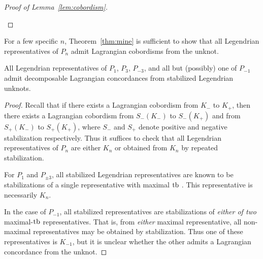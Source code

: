 \begin{proof}[Proof of Lemma~\ref{lem:cobordism}]
\begin{itemize}
\end{itemize}

\end{proof}

For a few specific $n$, Theorem~\ref{thm:mine} is sufficient to show that all Legendrian representatives of $P_n$ admit Lagrangian cobordisms from the unknot.
\begin{corollary}
    All Legendrian representatives of $P_1$, $P_3$, $P_{-3}$, and all but (possibly) one of $P_{-1}$ admit decomposable Lagrangian concordances from stabilized Legendrian unknots.
\end{corollary}
\begin{proof}

    Recall that if there exists a Lagrangian cobordism from $K_-$ to $K_+$, then there exists a Lagrangian cobordism from $S_-(K_-)$ to $S_-(K_+)$ and from $S_+(K_-)$ to $S_+(K_+)$, where $S_-$ and $S_+$ denote positive and negative stabilization respectively. Thus it suffices to check that all Legendrian representatives of $P_n$ are either $K_n$ or obtained from $K_n$ by repeated stabilization.

    For $P_{1}$ and $P_{\pm 3}$, all stabilized Legendrian representatives are known to be stabilizations of a single representative with maximal $\operatorname{tb}$ \cite{atlas}. This representative is necessarily $K_n$.

    In the case of $P_{-1}$, all stabilized representatives are stabilizations of \emph{either of two} maximal-$\operatorname{tb}$ representatives. That is, from \emph{either} maximal representative, all non-maximal representatives may be obtained by stabilization. Thus one of these representatives is $K_{-1}$, but it is unclear whether the other admits a Lagrangian concordance from the unknot.

\end{proof}
